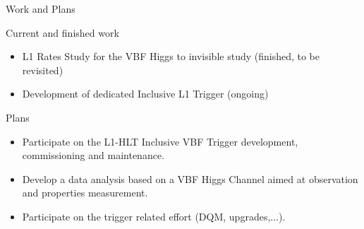 \documentclass[8pt]{beamer}
\begin{document}
\begin{frame}{Work and Plans}
  
  \begin{block}{Current and finished work}

    \begin{itemize}
      \item L1 Rates Study for the VBF Higgs to invisible study (finished, to be revisited)
      \item Development of dedicated Inclusive L1 Trigger (ongoing)
    \end{itemize}

  \end{block}

  \begin{block}{Plans}

    \begin{itemize}
      \item Participate on the L1-HLT Inclusive VBF Trigger development, commissioning and maintenance.   
      \item Develop a data analysis based on a VBF Higgs Channel aimed at observation and properties measurement.
      \item Participate on the trigger related effort (DQM, upgrades,...).
    \end{itemize}
    
  \end{block}

\end{frame}
\end{document}
